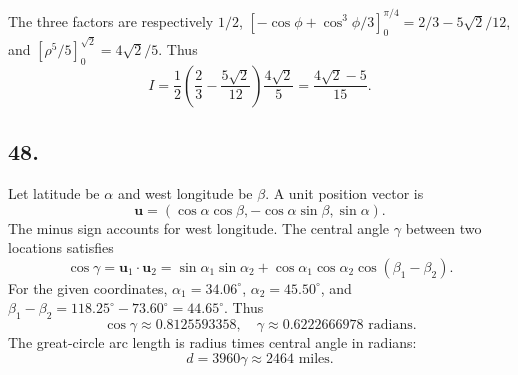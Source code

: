 \documentclass[11pt]{article}
\newcommand{\ex}[1]{\subsection*{#1.}}
\newcommand{\ans}[1]{\boxed{#1}}
\begin{document}
The three factors are respectively $1/2$, $[-\cos\phi+\cos^3\phi/3]_0^{\pi/4}=2/3-5\sqrt2/12$, and $[\rho^5/5]_0^{\sqrt2}=4\sqrt2/5$. Thus
\[I=\frac12\left(\frac23-\frac{5\sqrt2}{12}\right)\frac{4\sqrt2}{5}=\ans{\frac{4\sqrt2-5}{15}}.\]
\ex{48}
Let latitude be $\alpha$ and west longitude be $\beta$. A unit position vector is
\[\mathbf u=(\cos\alpha\cos\beta,-\cos\alpha\sin\beta,\sin\alpha).\]
The minus sign accounts for west longitude. The central angle $\gamma$ between two locations satisfies
\[\cos\gamma=\mathbf u_1\cdot\mathbf u_2
=\sin\alpha_1\sin\alpha_2+\cos\alpha_1\cos\alpha_2\cos(\beta_1-\beta_2).\]
For the given coordinates, $\alpha_1=34.06^\circ$, $\alpha_2=45.50^\circ$, and $\beta_1-\beta_2=118.25^\circ-73.60^\circ=44.65^\circ$. Thus
\[\cos\gamma\approx0.8125593358,\quad \gamma\approx0.6222666978\text{ radians}.\]
The great-circle arc length is radius times central angle in radians:
\[d=3960\gamma\approx\ans{2464\text{ miles}}.\]
\end{document}
